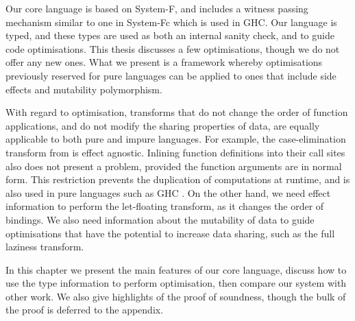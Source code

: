 
\label{Core:Introduction}

Our core language is based on System-F, and includes a witness passing mechanism similar to one in System-Fc \cite{sulzmann:system-Fc} which is used in GHC. Our language is typed, and these types are used as both an internal sanity check, and to guide code optimisations. This thesis discusses a few optimisations, though we do not offer any new ones. What we present is a framework whereby optimisations previously reserved for pure languages can be applied to ones that include side effects and mutability polymorphism.

With regard to optimisation, transforms that do not change the order of function applications, and do not modify the sharing properties of data, are equally applicable to both pure and impure languages. For example, the case-elimination transform from \cite{santos:compilation} is effect agnostic. Inlining function definitions into their call sites also does not present a problem, provided the function arguments are in normal form. This restriction prevents the duplication of computations at runtime, and is also used in pure languages such as GHC \cite{peyton-jones:transformation-based-optimiser}. On the other hand, we need effect information to perform the let-floating transform, as it changes the order of bindings. We also need information about the mutability of data to guide optimisations that have the potential to increase data sharing, such as the full laziness transform.

In this chapter we present the main features of our core language, discuss how to use the type information to perform optimisation, then compare our system with other work. We also give highlights of the proof of soundness, though the bulk of the proof is deferred to the appendix.


